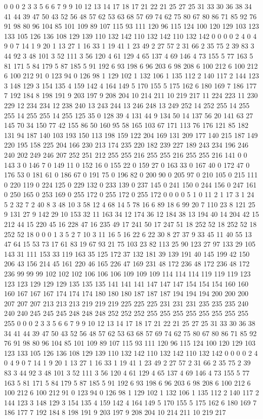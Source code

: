0 0 0 2 3 3 5 6 6 7 9 9 10 12 13 14 17 18 17 21 22 21 25 27 25 31 33 30 36 38 34 41 44 39 47 50 43 52 56 48 57 62 53 63 68 57 69 74 62 75 80 67 80 86 71 85 92 76 91 98 80 96 104 85 101 109 89 107 115 93 111 120 96 115 124 100 120 129 103 123 133 105 126 136 108 129 139 110 132 142 110 132 142 110 132 142 0 0 0 0 2 4 0 4 9 0 7 14 1 9 20 1 13 27 1 16 33 1 19 41 1 23 49 2 27 57 2 31 66 2 35 75 2 39 83 3 44 92 3 48 101 3 52 111 3 56 120 4 61 129 4 65 137 4 69 146 4 73 155 5 77 163 5 81 171 5 84 179 5 87 185 5 91 192 6 93 198 6 96 203 6 98 208 6 100 212 6 100 212 6 100 212 91 0 123 94 0 126 98 1 129 102 1 132 106 1 135 112 2 140 117 2 144 123 3 148 129 3 154 135 4 159 142 4 164 149 5 170 155 5 175 162 6 180 169 7 186 177 7 192 184 8 198 191 9 203 197 9 208 204 10 214 211 10 219 217 
11 224 223 11 230 229 12 234 234 12 238 240 13 243 244 13 246 248 13 249 252 14 252 255 14 255 255 14 255 255 14 255 125 35 0 128 39 4 131 44 9 134 50 14 137 56 20 141 63 27 145 70 34 150 77 42 155 86 50 160 95 58 165 103 67 171 113 76 176 121 85 182 131 94 187 140 103 193 150 113 198 159 122 204 169 131 209 177 140 215 187 149 220 195 158 225 204 166 230 213 174 235 220 182 239 227 189 243 234 196 246 240 202 249 246 207 252 251 212 255 255 216 255 255 216 255 255 216 141 0 0 143 3 0 146 7 0 149 11 0 152 16 0 155 22 0 159 27 0 163 33 0 167 40 0 172 47 0 176 53 0 181 61 0 186 67 0 191 75 0 196 82 0 200 90 0 205 97 0 210 105 0 215 111 0 220 119 0 224 125 0 229 132 0 233 139 0 237 145 0 241 150 0 244 156 0 247 161 0 250 165 0 253 169 0 255 172 0 255 172 0 255 172 0 0 0 0 5 1 0 11 2 1 17 3 1 24 5 2 32 7 2 40 8 3 48 10 3 58 12 4 68 14 5 78 16 
6 89 18 6 99 20 7 110 23 8 121 25 9 131 27 9 142 29 10 153 32 11 163 34 12 174 36 12 184 38 13 194 40 14 204 42 15 212 44 15 220 45 16 228 47 16 235 49 17 241 50 17 247 51 18 252 52 18 252 52 18 252 52 18 0 0 0 1 3 5 2 7 10 3 11 16 5 16 22 6 22 30 8 27 37 9 33 45 11 40 55 13 47 64 15 53 73 17 61 83 19 67 93 21 75 103 23 82 113 25 90 123 27 97 133 29 105 143 31 111 153 33 119 163 35 125 172 37 132 181 39 139 191 40 145 199 42 150 206 43 156 214 45 161 220 46 165 226 47 169 231 48 172 236 48 172 236 48 172 236 99 99 99 102 102 102 106 106 106 109 109 109 114 114 114 119 119 119 123 123 123 129 129 129 135 135 135 141 141 141 147 147 147 154 154 154 160 160 160 167 167 167 174 174 174 180 180 180 187 187 187 194 194 194 200 200 200 207 207 207 213 213 213 219 219 219 225 225 225 231 231 231 235 235 235 240 240 240 245 245 245 248 248 248 252 252 252 255 255 255 255 255 255 255 255 255 
0 0 0 2 3 3 5 6 6 7 9 9 10 12 13 14 17 18 17 21 22 21 25 27 25 31 33 30 36 38 34 41 44 39 47 50 43 52 56 48 57 62 53 63 68 57 69 74 62 75 80 67 80 86 71 85 92 76 91 98 80 96 104 85 101 109 89 107 115 93 111 120 96 115 124 100 120 129 103 123 133 105 126 136 108 129 139 110 132 142 110 132 142 110 132 142 0 0 0 0 2 4 0 4 9 0 7 14 1 9 20 1 13 27 1 16 33 1 19 41 1 23 49 2 27 57 2 31 66 2 35 75 2 39 83 3 44 92 3 48 101 3 52 111 3 56 120 4 61 129 4 65 137 4 69 146 4 73 155 5 77 163 5 81 171 5 84 179 5 87 185 5 91 192 6 93 198 6 96 203 6 98 208 6 100 212 6 100 212 6 100 212 91 0 123 94 0 126 98 1 129 102 1 132 106 1 135 112 2 140 117 2 144 123 3 148 129 3 154 135 4 159 142 4 164 149 5 170 155 5 175 162 6 180 169 7 186 177 7 192 184 8 198 191 9 203 197 9 208 204 10 214 211 10 219 217 
